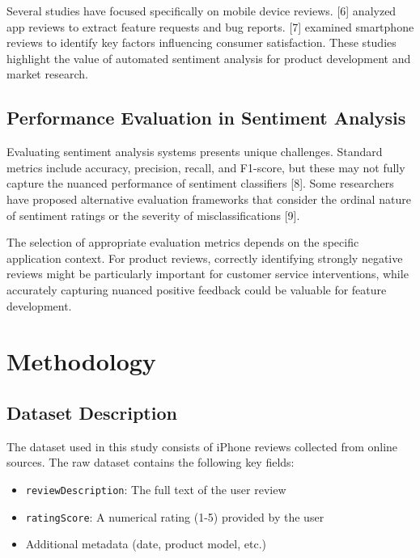 \documentclass[
]{article}
\providecommand{\tightlist}{%
  \setlength{\itemsep}{0pt}\setlength{\parskip}{0pt}}\usepackage{longtable,booktabs,array}
\begin{document}
Several studies have focused specifically on mobile device reviews.
{[}6{]} analyzed app reviews to extract feature requests and bug
reports. {[}7{]} examined smartphone reviews to identify key factors
influencing consumer satisfaction. These studies highlight the value of
automated sentiment analysis for product development and market
research.

\subsection{Performance Evaluation in Sentiment
Analysis}\label{performance-evaluation-in-sentiment-analysis}

Evaluating sentiment analysis systems presents unique challenges.
Standard metrics include accuracy, precision, recall, and F1-score, but
these may not fully capture the nuanced performance of sentiment
classifiers {[}8{]}. Some researchers have proposed alternative
evaluation frameworks that consider the ordinal nature of sentiment
ratings or the severity of misclassifications {[}9{]}.

The selection of appropriate evaluation metrics depends on the specific
application context. For product reviews, correctly identifying strongly
negative reviews might be particularly important for customer service
interventions, while accurately capturing nuanced positive feedback
could be valuable for feature development.

\section{Methodology}\label{methodology}

\subsection{Dataset Description}\label{dataset-description}

The dataset used in this study consists of iPhone reviews collected from
online sources. The raw dataset contains the following key fields:

\begin{itemize}
\tightlist
\item
  \texttt{reviewDescription}: The full text of the user review
\item
  \texttt{ratingScore}: A numerical rating (1-5) provided by the user
\item
  Additional metadata (date, product model, etc.)
\end{itemize}
\end{document}
